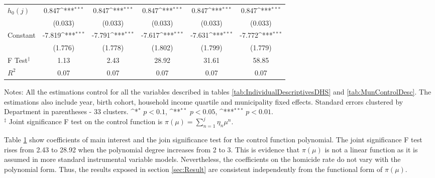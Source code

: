 \documentclass[a4paper,10pt,twocolumn,preprint,3p,authoryear]{elsarticle}
\def\sym#1{\ifmmode^{#1}\else\(^{#1}\)\fi}
\begin{document}
\begin{appendix}
\begin{table}[h]
\begin{tabular}{lccccc}
$h_{0}\left( j \right)$         &       0.847\sym{***}&	       0.847\sym{***}&	       0.847\sym{***}&	       0.847\sym{***}&	       0.847\sym{***}\\
            &     (0.033)         &	     (0.033)         &	     (0.033)         &	     (0.033)         &	     (0.033)         \\
				
Constant      &      -7.819\sym{***}&	      -7.791\sym{***}&	      -7.617\sym{***}&	      -7.631\sym{***}&	      -7.772\sym{***}\\
            &     (1.776)         &	     (1.778)         &	     (1.802)         &	     (1.799)         &	     (1.779)         \\
\hline				
F Test$^{\ddagger}$      &        1.13         &	        2.43         &	       28.92         &	       31.61         &	       58.85         \\
$R^{2}$       &        0.07         &	        0.07         &	        0.07         &	        0.07         &	        0.07         \\
\hline
	\end{tabular}
	\begin{minipage}[t]{1\columnwidth}%
		  \begin{spacing}{1}
		  \noindent 
		  {Notes: All the estimations control for all the variables described in tables \ref{tab:IndividualDescriptivesDHS} and \ref{tab:MunControlDesc}. The estimations also include year, birth cohort, household income quartile and municipality fixed effects. Standard errors clustered by Department in parentheses - 33 clusters. \sym{*} $p<0.1$, \sym{**} $p<0.05$, \sym{***} $p<0.01$. \\
			 $^{\ddagger}$ Joint significance F test on the control function is $\pi\left( \mu \right) = \sum_{n=1}^{j}\eta_{n}\mu^{n}$.} 		 
		  \end{spacing}
	  \end{minipage}
	\label{tab:SSPregnancyonhomRateDD10byCFpoly}
\end{table}

Table \ref{tab:SSPregnancyonhomRateDD10byCFpoly} show coefficients of main interest and the join significance test for the control function polynomial. The joint significance F test rises from 2.43 to 28.92 when the polynomial degree increases from 2 to 3. This is evidence that $\pi\left( \mu \right)$ is not a linear function as it is assumed in more standard instrumental variable models. Nevertheless, the coefficients on the homicide rate do not vary with the polynomial form. Thus, the results exposed in section \ref{sec:Result} are consistent independently from the functional form of $\pi\left( \mu \right)$.


\end{appendix}
\end{document}
